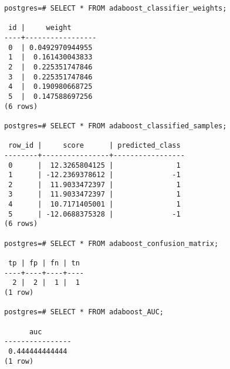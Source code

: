 \begin{verbatim}
postgres=# SELECT * FROM adaboost_classifier_weights;

 id |     weight      
----+-----------------
 0  | 0.0492970944955
 1  |  0.161430043833
 2  |  0.225351747846
 3  |  0.225351747846
 4  |  0.190980668725
 5  |  0.147588697256
(6 rows)

postgres=# SELECT * FROM adaboost_classified_samples;

 row_id |     score      | predicted_class 
--------+----------------+-----------------
 0      |  12.3265804125 |               1
 1      | -12.2369378612 |              -1
 2      |  11.9033472397 |               1
 3      |  11.9033472397 |               1
 4      |  10.7171405001 |               1
 5      | -12.0688375328 |              -1
(6 rows)

postgres=# SELECT * FROM adaboost_confusion_matrix;

 tp | fp | fn | tn 
----+----+----+----
  2 |  2 |  1 |  1
(1 row)

postgres=# SELECT * FROM adaboost_AUC;

      auc       
----------------
 0.444444444444
(1 row)

\end{verbatim}
